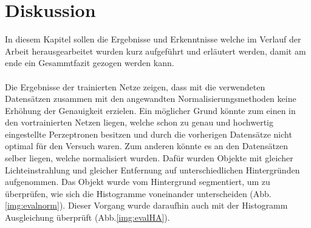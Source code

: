 \documentclass[a4paper,12pt,oneside]{article}
\begin{document}
\section{Diskussion}
In diesem Kapitel sollen die Ergebnisse und Erkenntnisse welche im Verlauf der Arbeit herausgearbeitet wurden kurz aufgeführt und erläutert werden, damit am ende ein Gesammtfazit gezogen werden kann.\\\\
Die Ergebnisse der trainierten Netze zeigen, dass mit die verwendeten Datensätzen zusammen mit den angewandten Normalisierungsmethoden keine Erhöhung der Genauigkeit erzielen. Ein möglicher Grund könnte zum einen in den vortrainierten Netzen liegen, welche schon zu genau und hochwertig eingestellte Perzeptronen besitzen und durch die vorherigen Datensätze nicht optimal für den Versuch waren. Zum anderen könnte es an den Datensätzen selber liegen, welche normalisiert wurden. Dafür wurden Objekte mit gleicher Lichteinstrahlung und gleicher Entfernung auf unterschiedlichen Hintergründen aufgenommen. Das Objekt wurde vom Hintergrund segmentiert, um zu überprüfen, wie sich die Histogramme voneinander unterscheiden (Abb.\ref{img:evalnorm}). Dieser Vorgang wurde daraufhin auch mit der Histogramm Ausgleichung überprüft (Abb.\ref{img:evalHA}).\\
\end{document}
